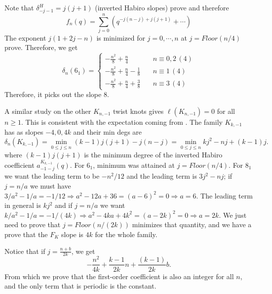 \documentclass[11pt,e-only]{amsart}
\begin{document}
\begin{example}
Note that $\delta_{-j-1}^H = j(j+1)$ (inverted Habiro slopes) \alert{prove} and therefore
\begin{equation}
    f_n(q)=\sum_{j=0}^n \left(q^{-j(n-j)+j(j+1)}+\cdots\right)
\end{equation}
The exponent $j(1+2j-n)$ is minimized for $j=0,\cdots, n$ at $j=Floor(n/4)$ \alert{prove}. Therefore, we get
\begin{equation}
    \delta_n(6_1)=\begin{cases}
        -\frac{n^2}{8}+\frac{n}{4} \quad &n\equiv 0,2\,(4) \\
        -\frac{n^2}{8} + \frac{n}{4} - \frac18 \quad &n\equiv 1\,(4) \\
        -\frac{n^2}{8} + \frac{n}{4} + \frac38 \quad &n\equiv 3\,(4)
    \end{cases}
\end{equation}
Therefore, it picks out the slope $8$.


\end{example}


A similar study on the other $K_{n,-1}$ twist knots gives $\ell(K_{n,-1})=0$ for all $n\geq 1$. This is consistent with the expectation coming from \cite[Section 7]{L-inv}. %
The family $K_{k,-1}$ has as slopes $-4,0,4k$ and their min degs are
\begin{equation}
    \delta_n(K_{k,-1})=\min_{0\leq j\leq n}{(k-1)j(j+1)-j(n-j)} = \min_{0\leq j\leq n}{kj^2-n j+(k-1)j}.
\end{equation}
where $(k-1)j(j+1)$ is the minimum degree of the inverted Habiro coefficient $a_{-1-j}^{K_{k,-1}}(q)$. For $6_1$, minimum was attained at $j=Floor(n/4)$. For $8_1$ we want the leading term to be $-n^2/12$ and the leading term is $3j^2-n j$; if $j=n/a$ we must have $3/a^2-1/a=-1/12\Rightarrow a^2-12a+36=(a-6)^2=0\Rightarrow a=6$. The leading term in general is $k j^2$ and if $j=n/a$ we want $k/a^2-1/a=-1/(4k)\Rightarrow a^2-4k a+4k^2=(a-2k)^2=0 \Rightarrow a=2k$. We just need to prove that $j=Floor(n/(2k))$ minimizes that quantity, and we have a prove that the $F_K$ slope is $4k$ for the whole family.

Notice that if $j=\frac{n+b}{2k}$, we get
\begin{equation}
    -\frac{n^2}{4k}+\frac{k-1}{2k}n + \frac{(k-1)}{2k}b.
\end{equation}
From which we prove that the first-order coefficient is also an integer for all $n$, and the only term that is periodic is the constant. 
\end{document}
